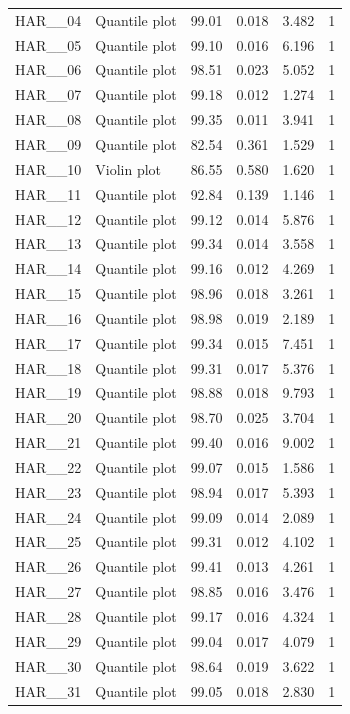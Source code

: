 \begin{longtable}{llrrrr}
HAR\_\_04 & Quantile plot & 99.01 & 0.018 & 3.482 & 1\\
HAR\_\_05 & Quantile plot & 99.10 & 0.016 & 6.196 & 1\\
HAR\_\_06 & Quantile plot & 98.51 & 0.023 & 5.052 & 1\\
HAR\_\_07 & Quantile plot & 99.18 & 0.012 & 1.274 & 1\\
HAR\_\_08 & Quantile plot & 99.35 & 0.011 & 3.941 & 1\\
HAR\_\_09 & Quantile plot & 82.54 & 0.361 & 1.529 & 1\\
HAR\_\_10 & Violin plot & 86.55 & 0.580 & 1.620 & 1\\
HAR\_\_11 & Quantile plot & 92.84 & 0.139 & 1.146 & 1\\
HAR\_\_12 & Quantile plot & 99.12 & 0.014 & 5.876 & 1\\
HAR\_\_13 & Quantile plot & 99.34 & 0.014 & 3.558 & 1\\
HAR\_\_14 & Quantile plot & 99.16 & 0.012 & 4.269 & 1\\
HAR\_\_15 & Quantile plot & 98.96 & 0.018 & 3.261 & 1\\
HAR\_\_16 & Quantile plot & 98.98 & 0.019 & 2.189 & 1\\
HAR\_\_17 & Quantile plot & 99.34 & 0.015 & 7.451 & 1\\
HAR\_\_18 & Quantile plot & 99.31 & 0.017 & 5.376 & 1\\
HAR\_\_19 & Quantile plot & 98.88 & 0.018 & 9.793 & 1\\
HAR\_\_20 & Quantile plot & 98.70 & 0.025 & 3.704 & 1\\
HAR\_\_21 & Quantile plot & 99.40 & 0.016 & 9.002 & 1\\
HAR\_\_22 & Quantile plot & 99.07 & 0.015 & 1.586 & 1\\
HAR\_\_23 & Quantile plot & 98.94 & 0.017 & 5.393 & 1\\
HAR\_\_24 & Quantile plot & 99.09 & 0.014 & 2.089 & 1\\
HAR\_\_25 & Quantile plot & 99.31 & 0.012 & 4.102 & 1\\
HAR\_\_26 & Quantile plot & 99.41 & 0.013 & 4.261 & 1\\
HAR\_\_27 & Quantile plot & 98.85 & 0.016 & 3.476 & 1\\
HAR\_\_28 & Quantile plot & 99.17 & 0.016 & 4.324 & 1\\
HAR\_\_29 & Quantile plot & 99.04 & 0.017 & 4.079 & 1\\
HAR\_\_30 & Quantile plot & 98.64 & 0.019 & 3.622 & 1\\
HAR\_\_31 & Quantile plot & 99.05 & 0.018 & 2.830 & 1\\

\end{longtable}
